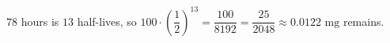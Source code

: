 $78$ hours is $13$ half-lives, so $100\cdot\left(\dfrac12\right)^{13}=\dfrac{100}{8192}=\boxed{\dfrac{25}{2048}\approx0.0122\text{ mg}}$ remains.

